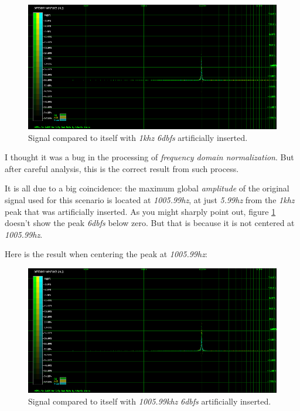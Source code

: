 \documentclass[10pt,a4paper]{report}
\newcommand{\hz}[1]{\textit{#1\acrshort{hz}}}
\newcommand{\khz}[1]{\textit{#1\acrshort{khz}}}
\newcommand{\db}[1]{\textit{#1\acrshort{dbfs}}}
\begin{document}
\begin{appendices}
\begin{figure}[H]
	\centering
	\includegraphics[width=1.0\linewidth]{images/corner/plot1.png}
	\caption[Corner Case 1]{Signal compared to itself with \khz{1} \db{6} artificially inserted.}
	\label{fig:corner1}
\end{figure}

I thought it was a bug in the processing of \textit{frequency domain normalization}. But after careful analysis, this is the correct result from such process.

It is all due to a big coincidence: the maximum global \textit{amplitude} of the original signal used for this scenario is located at \hz{1005.99}, at just \hz{5.99} from the \khz{1} peak that was artificially inserted. As you might sharply point out, figure \ref{fig:corner1} doesn't show the peak \db{6} below zero. But that is because it is not centered at \hz{1005.99}. 

Here is the result when centering the peak at \hz{1005.99}:

\begin{figure}[H]
\centering
\includegraphics[width=1.0\linewidth]{images/corner/plot2.png}
\caption[Corner Case 2]{Signal compared to itself with \khz{1005.99} \db{6} artificially inserted.}
\label{fig:corner2}
\end{figure}


\end{appendices}
\end{document}
